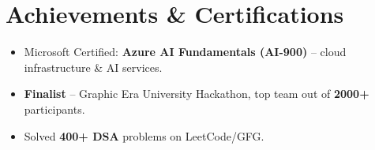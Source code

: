 \documentclass[letterpaper,11pt]{article}
\newcommand{\resumeItem}[1]{
  \item \small{#1}
}
\newcommand{\resumeItemListStart}{
\begin{itemize}[leftmargin=*, itemsep=0pt, topsep=0pt, parsep=0pt, partopsep=0pt]
}
\newcommand{\resumeItemListEnd}{\end{itemize}\vspace{-5pt}}
\begin{document}
\section{Achievements \& Certifications}
\resumeItemListStart
\resumeItem{Microsoft Certified: \textbf{Azure AI Fundamentals (AI-900)} -- cloud infrastructure \& AI services.}
\resumeItem{\textbf{Finalist} -- Graphic Era University Hackathon, top team out of \textbf{2000+} participants.}
\resumeItem{Solved \textbf{400+ DSA} problems on LeetCode/GFG.}
\resumeItemListEnd
\end{document}
